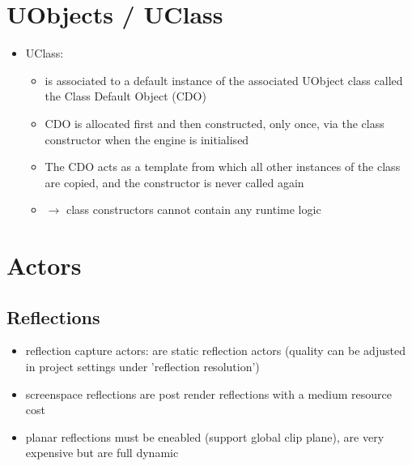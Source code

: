 \documentclass{scrbook}
\begin{document}
        \section{UObjects / UClass}
            \begin{itemize}
                \item UClass: 
                \begin{itemize}
                    \item is associated to a default instance of the associated UObject class called the Class Default Object (CDO)
                    \item CDO is allocated first and then constructed, only once, via the class constructor when the engine is initialised
                    \item The CDO acts as a template from which all other instances of the class are copied, and the constructor is never called again
                    \item $\rightarrow$ class constructors cannot contain any runtime logic
                \end{itemize} 
            \end{itemize}

        \section{Actors}
            \subsection{Reflections}
                \begin{itemize}
                    \item reflection capture actors: are static reflection actors (quality can be adjusted in project settings under 'reflection resolution')
                    \item screenspace reflections are post render reflections with a medium resource cost
                    \item planar reflections must be eneabled (support global clip plane), are very expensive but are full dynamic  
                \end{itemize}
\end{document}
